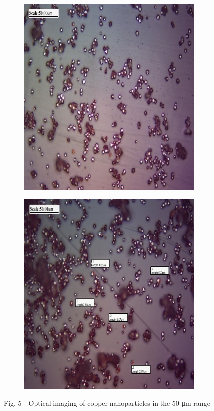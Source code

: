 \begin{figure}[H]
    \centering
    \begin{subfigure}[b]{0.45\textwidth}
        \centering
        \includegraphics[width=\textwidth]{assets/17}
    \end{subfigure}
    \hfill
    \begin{subfigure}[b]{0.45\textwidth}
        \centering
        \includegraphics[width=\textwidth]{assets/18}
    \end{subfigure}
    \caption*{Fig. 5 - Optical imaging of copper nanoparticles in the 50 μm range}
\end{figure}

